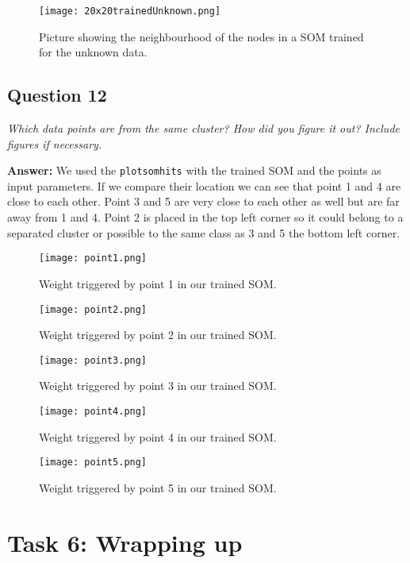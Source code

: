 \documentclass[a4paper]{article}
\begin{document}
 \begin{figure}[H] %
	 \texttt{[image: 20x20trainedUnknown.png]}
	 \caption{\label{fig:20x20trainedUnknown} Picture showing the neighbourhood of the nodes in a SOM trained for the unknown data.}
 \end{figure}

\subsection*{Question 12}
\emph{Which data points are from the same cluster? How did you
figure it out? Include figures if necessary.} 

\textbf{Answer:} We used the \texttt{plotsomhits} with the trained SOM and the points as input parameters. If we compare their location we can see that point 1 and 4 are close to each other. Point 3 and 5 are very close to each other as well but are far away from 1 and 4. Point 2 is placed in the top left corner so it could belong to a separated cluster or possible to the same class as 3 and 5 the bottom left corner.

 \begin{figure}[H] %
	 \texttt{[image: point1.png]}
	 \caption{\label{fig:point1} Weight triggered by point 1 in our trained SOM.}
 \end{figure}
 \begin{figure}[H] %
	 \texttt{[image: point2.png]}
	 \caption{\label{fig:point2} Weight triggered by point 2 in our trained SOM.}
 \end{figure}
 \begin{figure}[H] %
	 \texttt{[image: point3.png]}
	 \caption{\label{fig:point3} Weight triggered by point 3 in our trained SOM.}
 \end{figure}
 \begin{figure}[H] %
	 \texttt{[image: point4.png]}
	 \caption{\label{fig:point4} Weight triggered by point 4 in our trained SOM.}
 \end{figure}
 \begin{figure}[H] %
	 \texttt{[image: point5.png]}
	 \caption{\label{fig:point5} Weight triggered by point 5 in our trained SOM.}
 \end{figure}
 \pagebreak
\section*{Task 6: Wrapping up}
\end{document}
